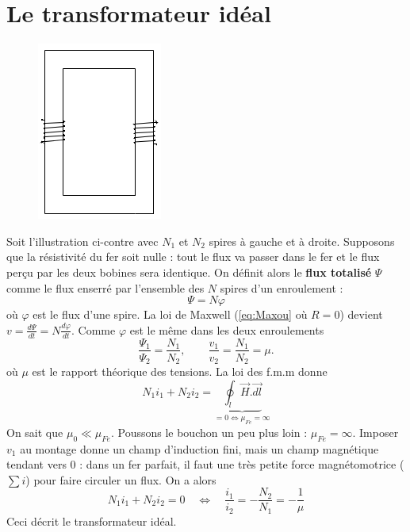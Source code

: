 \section{Le transformateur idéal}
		\begin{figure}
		\vspace{-5mm}
		\includegraphics[scale=0.4]{ch3/image1.png}
		\end{figure}
Soit l'illustration ci-contre avec $N_1$ et $N_2$ spires à gauche 
et à droite. Supposons que la résistivité du fer soit nulle : tout 
le flux va passer dans le fer et le flux perçu par les deux bobines 
sera identique. On définit alors le \textbf{flux totalisé} $\Psi$ 
comme le flux enserré par l'ensemble des $N$ spires d'un enroulement :
\begin{equation}
\Psi = N\varphi
\end{equation}
où $\varphi$ est le flux d'une spire. La loi de Maxwell (\autoref{eq:Maxou} 
où $R=0$) devient $v = \frac{d\Psi}{dt} = N\frac{d\varphi}{dt}$. Comme $\varphi$ 
est le même dans les deux enroulements
\begin{equation}
\frac{\Psi_1}{\Psi_2} = \dfrac{N_1}{N_2},\qquad \frac{v_1}{v_2} = 
\frac{N_1}{N_2} = \mu.
\end{equation}
où $\mu$ est le rapport théorique des tensions. La loi des f.m.m 
donne
\begin{equation}
N_1i_1 + N_2i_2 = \underbrace{\oint_l \vec{H}.\vec{dl}}_{=0
\Leftrightarrow \mu_{Fe}=\infty}
\end{equation}
On sait que $\mu_0 \ll \mu_{Fe}$. Poussons le bouchon un peu plus 
loin : $\mu_{Fe} = \infty$. Imposer $v_1$ au montage donne un champ 
d'induction fini, mais un champ magnétique tendant vers 0 : dans un 
fer parfait, il faut une très petite force magnétomotrice ($\sum i$) 
pour faire circuler un flux. On a alors
\begin{equation}
N_1i_1 + N_2i_2 =0\quad\Leftrightarrow\quad \frac{i_1}{i_2} = -
\frac{N_2}{N_1} = -\frac{1}{\mu}
\end{equation}
Ceci décrit le transformateur idéal.

